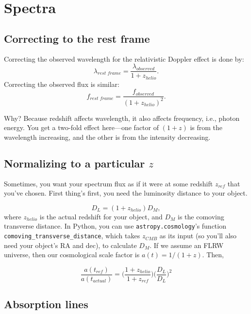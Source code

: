 \section{Spectra}
\subsection{Correcting to the rest frame}
\label{sec:spec_restframe}
Correcting the observed wavelength for the relativistic Doppler effect is done by: 
\begin{equation}
    \lambda_{rest \,\, frame} = \frac{\lambda_{observed}}{1+z_{helio}}.
\end{equation}
Correcting the observed flux is similar: 
\begin{equation}
    f_{rest \,\, frame} = \frac{f_{observed}}{(1+z_{helio})^{2}}.
\end{equation}

Why? Because redshift affects wavelength, it also affects frequency, i.e., photon energy. You get a two-fold effect here---one factor of $(1 + z)$ is from the wavelength increasing, and the other is from the intensity decreasing. 

\subsection{Normalizing to a particular $z$}
Sometimes, you want your spectrum flux as if it were at some redshift $z_{ref}$ that you've chosen. First thing's first, you need the luminosity distance to your object.

\begin{equation}
    D_{L} = (1+z_{helio})D_{M},
\end{equation}
where $z_{helio}$ is the actual redshift for your object, and $D_{M}$ is the comoving transverse distance. In Python, you can use \texttt{astropy.cosmology}'s function \texttt{comoving\_transverse\_distance}, which takes $z_{CMB}$ as its input (so you'll also need your object's RA and dec), to calculate $D_{M}$. If we assume an FLRW universe, then our cosmological scale factor is $a(t) = 1/(1+z)$. Then,

\begin{equation}
    \frac{a(t_{ref})}{a(t_{actual})} = \Big( \frac{1 + z_{helio}}{1+z_{ref}} \Big) \Big( \frac{D_{L}}{D_{L}} \Big)^{2}
\end{equation}

\subsection{Absorption lines}
